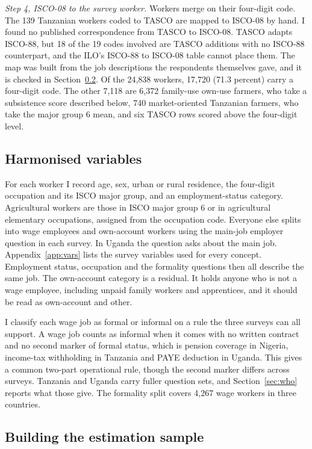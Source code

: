 \emph{Step 4, ISCO-08 to the survey worker.} Workers merge on their four-digit
code. The 139 Tanzanian workers coded to TASCO are mapped to ISCO-08 by hand.
I found no published correspondence from TASCO to ISCO-08. TASCO adapts
ISCO-88, but 18 of the 19 codes involved are TASCO additions with no ISCO-88
counterpart, and the ILO's ISCO-88 to ISCO-08 table cannot place them. The map
was built from the job
descriptions the respondents themselves gave, and it is checked in
Section~\ref{sec:sample}. Of the 24,838 workers, 17,720 (71.3 percent) carry a
four-digit code. The other 7,118 are 6,372 family-use own-use farmers, who take
a subsistence score described below, 740 market-oriented Tanzanian farmers, who
take the major group 6 mean, and six TASCO rows scored above the four-digit
level.

\subsection{Harmonised variables}

For each worker I record age, sex, urban or rural residence, the four-digit
occupation and its ISCO major group, and an employment-status category.
Agricultural workers are those in ISCO major group 6 or in agricultural
elementary occupations, assigned from the occupation code. 
Everyone else splits into wage employees and
own-account workers using the main-job employer question in each survey. In
Uganda the question asks about the main job. Appendix~\ref{app:vars} lists
the survey variables used for every concept.
Employment status, occupation and the formality questions then all describe the
same job. The own-account category is a residual. It holds anyone who is not a wage
employee, including unpaid family workers and apprentices, and it should be read
as own-account and other.

I classify each wage job as formal or informal on a rule the three surveys can
all support. A wage job counts as informal when it comes with no written contract
and no second marker of formal status, which is pension coverage in Nigeria,
income-tax withholding in Tanzania and PAYE deduction in Uganda. This gives a
common two-part operational rule, though the second marker differs across
surveys. Tanzania
and Uganda carry fuller question sets, and Section~\ref{sec:who} reports what
those give. The formality split covers 4,267 wage workers in three countries.

\subsection{Building the estimation sample}
\label{sec:sample}

